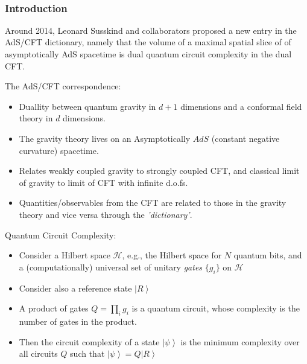 \documentclass[10pt,aspectratio=169]{beamer}
\newcommand{\ket}[1]{\left| #1 \right>}
\begin{document}
~~~~~~~~~~~~~~~~~~~~~~~~~~~~~~~~~~~~~~~~~~~~~~~~~~~~~~

\begin{frame}
\frametitle{Introduction}

Around 2014, Leonard Susskind and collaborators proposed a new entry in the {\color{blue} AdS/CFT dictionary}, namely that the volume of a maximal spatial slice of of asymptotically AdS spacetime is dual {\color{red} quantum circuit complexity} in the dual CFT.


\begin{minipage}[t]{0.48\linewidth}

{\color{blue} The AdS/CFT correspondence}:

\begin{itemize}

	\item Duallity between quantum gravity in $d+1$ dimensions and a conformal field theory in $d$ dimensions.
	
	\item The gravity theory lives on an Asymptotically $AdS$ (constant negative curvature) spacetime. 
	
	\item Relates weakly coupled gravity to strongly coupled CFT, and classical limit of gravity to limit of CFT with infinite d.o.fs.
	
	\item Quantities/observables from the CFT are related to those in the gravity theory and vice versa through the {\it 'dictionary'}.

\end{itemize}

\end{minipage}\hfill
%
\begin{minipage}[t]{0.48\linewidth}

{\color{red} Quantum Circuit Complexity}:

\begin{itemize}

	\item Consider a Hilbert space $\mathcal{H}$, e.g., the Hilbert space for $N$ quantum bits, and a (computationally) universal set of unitary {\it gates} $\{g_i\}$ on $\mathcal{H}$

	\item Consider also a reference state $\ket{R}$
	
	\item A product of gates $Q = \prod_i g_i$ is a quantum circuit, whose complexity is the number of gates in the product.
	
	\item Then the circuit complexity of a state $\ket{\psi}$ is the minimum complexity over all circuits $Q$ such that $\ket{\psi} = Q \ket{R}$

\end{itemize}

\end{minipage}

\end{frame}
\end{document}
